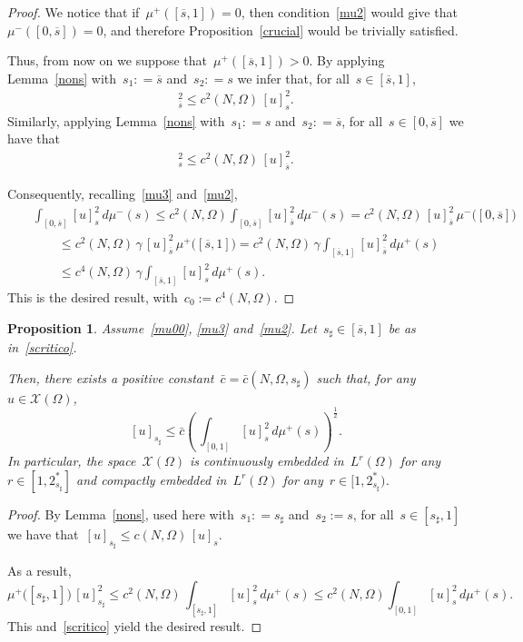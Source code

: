 \documentclass[12pt,a4paper,intlimits,sumlimits]{amsart}
\theoremstyle{definition}
\theoremstyle{plain}
\newtheorem{proposition}[definition]{Proposition}
\numberwithin{equation}{section}
\renewcommand{\le}{\leqslant}
\begin{document}
\begin{proof}
We notice that if~$\mu^+([\overline s,1])=0$, then condition~\eqref{mu2} would give that~$\mu^-([0,\overline s])=0$,
and therefore Proposition~\ref{crucial} would be trivially satisfied.

Thus, from now on we suppose that~$\mu^+([\overline s,1])>0$.
By applying Lemma~\ref{nons} with~$s_1: = \overline s$ and~$s_2: = s$ we infer that, for all~$s\in[\overline s,1]$,
\begin{eqnarray*}
[u]^2_{\overline s}\le c^2(N,\Omega) \, [u]^2_{s}.
\end{eqnarray*}
Similarly,  applying Lemma~\ref{nons} with~$s_1: = s$ and~$s_2: = \overline s$, for all~$s\in[0,\overline s]$ we have that
\begin{eqnarray*}
[u]^2_{s}\le c^2(N,\Omega) \, [u]^2_{\overline s}.
\end{eqnarray*}

Consequently, recalling~\eqref{mu3} and~\eqref{mu2},
\begin{eqnarray*}&&
\int_{[{{ 0 }}, \overline s]} [u]_{s}^2 \, d\mu^- (s)\le c^2(N,\Omega) \int_{[{{ 0 }}, \overline s]} [u]^2_{\overline s}\, d\mu^- (s)=c^2(N,\Omega) \,[u]^2_{\overline s}\,\mu^-\big({[{{ 0 }}, \overline s]}\big)\\&&\qquad\le
c^2(N,\Omega) \,\gamma\,[u]^2_{\overline s}\,
\mu^+\big([\overline s, 1]\big)=
c^2(N,\Omega) \,\gamma \int_{[\overline s, 1]}[u]^2_{\overline s}\,d\mu^+(s)
 \\&&\qquad\le
c^4(N,\Omega) \,\gamma \int_{[\overline s, 1]}[u]^2_{s}\,d\mu^+(s)
.
\end{eqnarray*}
This is the desired result, with~$c_0:=c^4(N,\Omega)$.
\end{proof}

\begin{proposition}\label{emb}Assume~\eqref{mu00}, \eqref{mu3} and~\eqref{mu2}.
Let~$s_\sharp\in [\overline s, 1]$ be as in~\eqref{scritico}. 

Then, there exists a positive constant~$\bar c =\bar c (N,\Omega, s_\sharp)$ such that, for any~$u\in \mathcal{X}(\Omega)$,
\begin{equation}\label{pqwodfl134rt}
[u]_{s_\sharp}\le \bar{c}\left(\, \int_{[{{ 0 }}, 1]} [u]^2_{s}\, d\mu^+ (s)\right)^{\frac12}.
\end{equation}
In particular, the space~$\mathcal{X}(\Omega)$ is continuously embedded in~$L^r(\Omega)$ for any~$r\in [1, 2^*_{s_\sharp}]$ and
compactly embedded in~$L^r(\Omega)$ for any~$r\in [1, 2^*_{s_\sharp})$.
\end{proposition}
\begin{proof} By Lemma~\ref{nons}, used here with~$s_1: = s_\sharp$ and~$s_2 := s$,
for all~$s\in[s_\sharp,1]$ we have that~$[u]_{s_\sharp}\le c(N,\Omega) \, [u]_{s}$.

As a result,
$$ \mu^+ \big([s_\sharp, 1]\big)\,[u]_{s_\sharp}^2\le c^2(N,\Omega) \, \int_{[s_\sharp, 1]}[u]_{s}^2\,d\mu^+(s)\le
c^2(N,\Omega)\int_{[{{ 0 }}, 1]} [u]^2_{s}\, d\mu^+ (s).
$$
This and~\eqref{scritico} yield the desired result.\end{proof}
\end{document}
